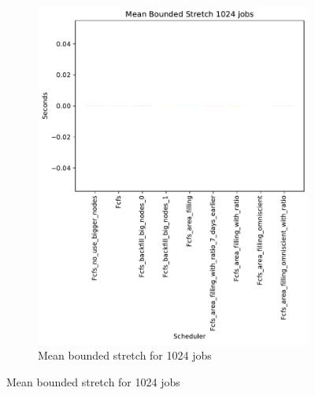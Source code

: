 \documentclass[a4paper]{article}
\begin{document}
\begin{figure}[H]
\begin{subfigure}[b]{0.4\linewidth}\centering\includegraphics[width=0.95\linewidth]{MBSS/plot/Size_Constraint_2022-01-17->2022-01-17_V10000_Mean_Stretch_With_a_Minimum_1024_450_128_32_256_4_1024.pdf}\caption{Mean bounded stretch for 1024 jobs}\label{45}\end{subfigure}

\end{figure}
\end{document}
